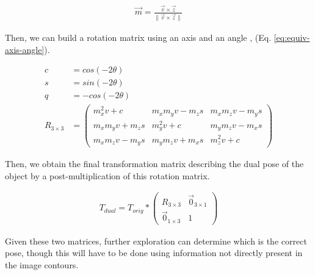 \begin{equation}
    \begin{aligned}
        \vec{m} = \frac{\vec{v} \times \vec{z}}{\|\vec{v} \times \vec{z}\|}
    \end{aligned}
    \label{eq:perp-axis}
\end{equation}

Then, we can build a rotation matrix using an axis and an angle \cite{craneKinematicAnalysisRobot2008}, (Eq. \ref{eq:equiv-axis-angle}).

\begin{equation}
    \begin{aligned}
        c &= cos(-2\theta)\\
        s &= sin(-2\theta) \\
        q &= -cos(-2\theta)\\
        R_{3 \times 3} &= \begin{pmatrix}
            m_x^2v + c & m_xm_yv - m_zs & m_x m_z v - m_y s \\ m_x m_y v + m_z s & m_y^2 v + c & m_y m_z v - m_x s \\ m_x m_z v - m_y s & m_y m_z v + m_x s & m_z^2 v + c
        \end{pmatrix}
    \end{aligned}
    \label{eq:equiv-axis-angle}
\end{equation}

Then, we obtain the final transformation matrix describing the dual pose of the object by a post-multiplication of this rotation matrix.

\begin{equation}
    \begin{aligned}
        T_{dual} = T_{orig} * \begin{pmatrix}
            R_{3 \times 3} & \vec{0}_{3 \times 1} \\ \vec{0}_{1 \times 3} & 1
        \end{pmatrix}
    \end{aligned}
    \label{eq:rotation-matrix-mult}
\end{equation}

Given these two matrices, further exploration can determine which is the correct pose, though this will have to be done using information not directly present in the image contours.